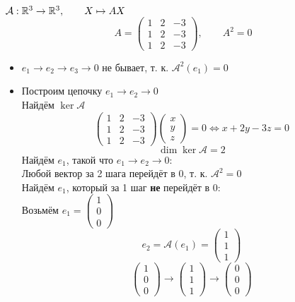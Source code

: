 \begin{eg}
	$ \mathcal{A} : \mathbb{R}^3 \to \mathbb{R}^3, \qquad X \mapsto AX $
	$$ A =
	\begin{pmatrix}
		1 & 2 & -3 \\
		1 & 2 & -3 \\
		1 & 2 & -3
	\end{pmatrix}, \qquad A^2 = 0 $$
	\begin{itemize}
		\item $ e_1 \to e_2 \to e_3 \to 0 $ не бывает, т. к. $ \mathcal{A}^2(e_1) = 0 $
		\item Построим цепочку $ e_1 \to e_2 \to 0 $ \\
		Найдём $ \ker \mathcal{A} $
		$$
		\begin{pmatrix}
		1 & 2 & -3 \\
		1 & 2 & -3 \\
		1 & 2 & -3
	\end{pmatrix}
	\begin{pmatrix}
		x \\
		y \\
		z
	\end{pmatrix} = 0 \iff x + 2y - 3z = 0 $$
	$$ \dim \ker \mathcal{A} = 2 $$
	Найдём $ e_1 $, такой что $ e_1 \to e_2 \to 0 $: \\
	Любой вектор за 2 шага перейдёт в 0, т. к. $ \mathcal{A}^2 = 0 $ \\
	Найдём $ e_1 $, который за 1 шаг \textbf{не} перейдёт в 0: \\
	Возьмём $ e_1 =
	\begin{pmatrix}
		1 \\
		0 \\
		0
	\end{pmatrix} $
	$$ e_2 = \mathcal{A}(e_1) =
	\begin{pmatrix}
		1 \\
		1 \\
		1
	\end{pmatrix} $$
	$$
	\begin{pmatrix}
		1 \\
		0 \\
		0
	\end{pmatrix} \to
	\begin{pmatrix}
		1 \\
		1 \\
		1
	\end{pmatrix} \to
	\begin{pmatrix}
		0 \\
		0 \\
		0
	\end{pmatrix} $$

\end{itemize}
\end{eg}
